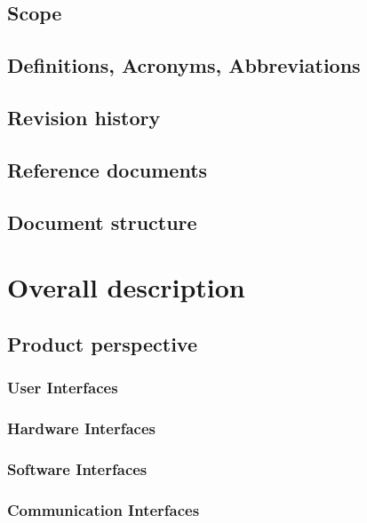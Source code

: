 \documentclass[a4paper,oneside,11pt]{article}
\begin{document}
        \subsection{Scope}
            
        \subsection{Definitions, Acronyms, Abbreviations}
            
        \subsection{Revision history}
        \subsection{Reference documents}
            
        \subsection{Document structure}
        
        
    \newpage
    \section{Overall description}
        \subsection{Product perspective}
            
            \subsubsection{User Interfaces}
                
            \subsubsection{Hardware Interfaces}
                
            \subsubsection{Software Interfaces}
                
            \subsubsection{Communication Interfaces}
                
\end{document}
